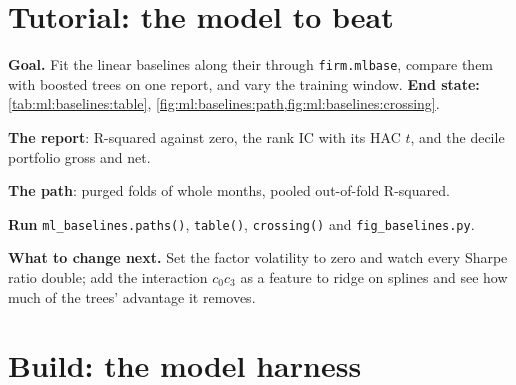 \section{Tutorial: the model to beat}\label{tut:ml:linear-and-regularised-baselines:tut}

\begin{tutorial}
\textbf{Goal.} Fit the linear baselines along their  through \texttt{firm.mlbase}, compare them with
boosted trees on one report, and vary the training window. \textbf{End state:} \cref{tab:ml:baselines:table},
\cref{fig:ml:baselines:path,fig:ml:baselines:crossing}.
\begin{tutsteps}
\item \textbf{The report}: R-squared against zero, the rank IC with its HAC $t$, and the decile portfolio gross and net.
\label{lst:ml:baselines:report}
\item \textbf{The path}: purged folds of whole months, pooled out-of-fold R-squared.
\label{lst:ml:baselines:path}
\item \textbf{Run} \texttt{ml\_baselines.paths()}, \texttt{table()}, \texttt{crossing()} and \texttt{fig\_baselines.py}.
\end{tutsteps}
\textbf{What to change next.} Set the factor volatility to zero and watch every Sharpe ratio double; add the
interaction $c_0c_3$ as a feature to ridge on splines and see how much of the trees' advantage it removes.
\end{tutorial}

\section{Build: the model harness}\label{bld:ml:linear-and-regularised-baselines:mlbase}

